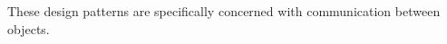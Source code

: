 \begin{defnbox}\nospacing
  \begin{defn}
    These design patterns are specifically concerned with communication between objects.
  \end{defn}
\end{defnbox}
